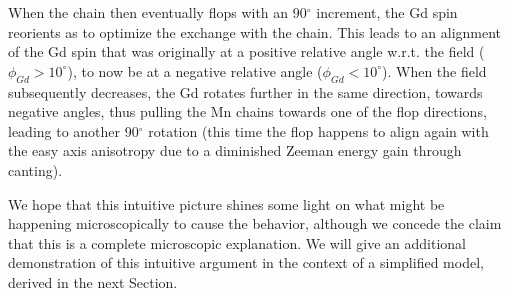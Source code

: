 When the chain then eventually flops with an 90$^\circ$ increment, the Gd spin reorients as to optimize the exchange with the chain.
This leads to an alignment of the Gd spin that was originally at a positive relative angle w.r.t. the field ($\phi_{Gd}>10^\circ$), to now be at a negative relative angle ($\phi_{Gd}<10^\circ$).
When the field subsequently decreases, the Gd rotates further in the same direction, towards negative angles, thus pulling the Mn chains towards one of the flop directions, leading to another 90$^\circ$ rotation (this time the flop happens to align again with the easy axis anisotropy due to a diminished Zeeman energy gain through canting).

%
We hope that this intuitive picture shines some light on what might be happening microscopically to cause the behavior, although we concede the claim that this is a complete microscopic explanation. We will give an additional demonstration of this intuitive argument in the context of a simplified model, derived in the next Section.

